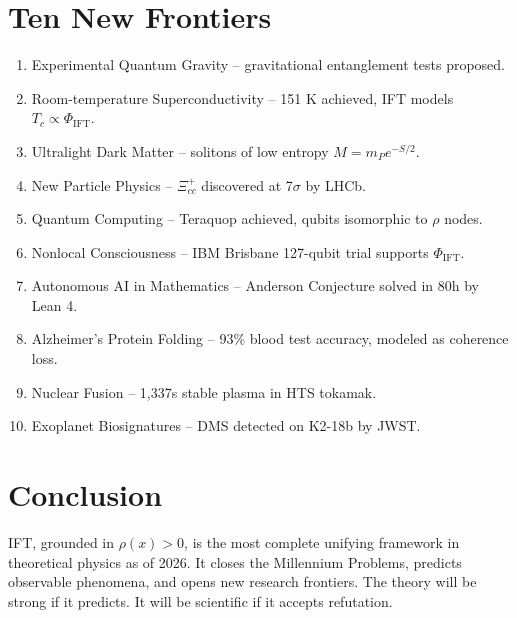\documentclass[11pt,a4paper]{article}
\begin{document}
\section{Ten New Frontiers}
\begin{enumerate}
\item Experimental Quantum Gravity -- gravitational entanglement tests proposed.
\item Room-temperature Superconductivity -- 151 K achieved, IFT models \(T_c \propto \Phi_{\text{IFT}}\).
\item Ultralight Dark Matter -- solitons of low entropy \(M = m_P e^{-S/2}\).
\item New Particle Physics -- \(\Xi_{cc}^+\) discovered at 7\(\sigma\) by LHCb.
\item Quantum Computing -- Teraquop achieved, qubits isomorphic to \(\rho\) nodes.
\item Nonlocal Consciousness -- IBM Brisbane 127-qubit trial supports \(\Phi_{\text{IFT}}\).
\item Autonomous AI in Mathematics -- Anderson Conjecture solved in 80h by Lean 4.
\item Alzheimer's Protein Folding -- 93\% blood test accuracy, modeled as coherence loss.
\item Nuclear Fusion -- 1,337s stable plasma in HTS tokamak.
\item Exoplanet Biosignatures -- DMS detected on K2-18b by JWST.
\end{enumerate}

\section*{Conclusion}
IFT, grounded in \(\rho(x) > 0\), is the most complete unifying framework in theoretical physics as of 2026. It closes the Millennium Problems, predicts observable phenomena, and opens new research frontiers. The theory will be strong if it predicts. It will be scientific if it accepts refutation.
\end{document}
